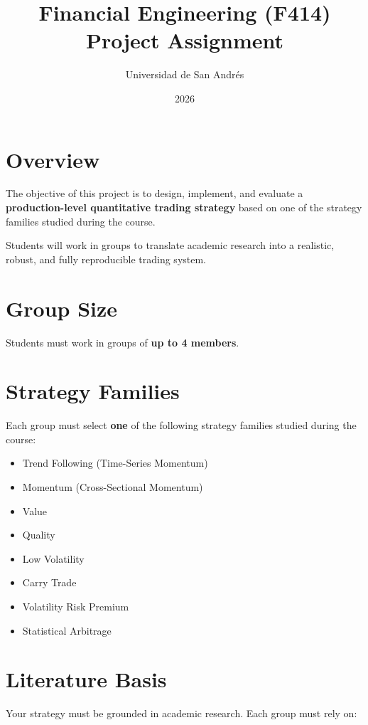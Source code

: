 \documentclass[12pt]{article}
\title{Financial Engineering (F414) \\ Project Assignment}
\author{Universidad de San Andrés}
\date{2026}
\begin{document}
\maketitle

\section*{Overview}

\noindent The objective of this project is to design, implement, and evaluate a
\textbf{production-level quantitative trading strategy} based on one of the
strategy families studied during the course.

\noindent Students will work in groups to translate academic research into a realistic,
robust, and fully reproducible trading system.

\section*{Group Size}

\noindent Students must work in groups of \textbf{up to 4 members}.

\section*{Strategy Families}

\noindent Each group must select \textbf{one} of the following strategy families studied
during the course:

\begin{itemize}
\item Trend Following (Time-Series Momentum)
\item Momentum (Cross-Sectional Momentum)
\item Value
\item Quality
\item Low Volatility
\item Carry Trade
\item Volatility Risk Premium
\item Statistical Arbitrage
\end{itemize}

\section*{Literature Basis}

\noindent Your strategy must be grounded in academic research. Each group must rely on:
\end{document}
